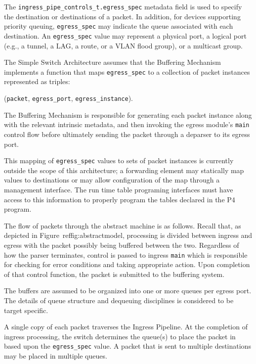 \documentclass[12pt]{article}
\begin{document}

The \texttt{ingress_pipe_controls_t.egress_spec} metadata field is used to
specify the destination  or destinations of a packet. In addition, for devices
supporting priority queuing, \texttt{egress_spec} may indicate the queue
associated with each destination. An \texttt{egress_spec} value may represent a
physical port, a logical port (e.g., a tunnel, a LAG, a route, or a VLAN flood
group), or a multicast group.

The Simple Switch Architecture assumes that the Buffering Mechanism implements a
function that maps \texttt{egress_spec} to a collection of packet instances
represented as triples:

\centerline{(\texttt{packet}, \texttt{egress_port}, \texttt{egress_instance}).}

The Buffering Mechanism is responsible for generating each packet instance along
with the relevant intrinsic metadata, and then invoking the egress module's
\texttt{main} control flow before ultimately sending the packet through a
deparser to its egress port.

This mapping of \texttt{egress_spec} values to sets of packet instances is
currently outside the scope of this architecture; a forwarding element may
statically map values to destinations or may allow configuration of the map
through a management interface. The run time table programing interfaces must
have access to this information to properly program the tables declared in the
P4 program.

The flow of packets through the abstract machine is as follows. Recall that, as
depicted in Figure~ref{fig:abstractmodel}, processing is divided between ingress
and egress with the packet possibly being buffered between the two. Regardless
of how the parser terminates, control is passed to ingress \texttt{main} which
is responsible for checking for error conditions and taking appropriate action.
Upon completion of that control function, the packet is submitted to the
buffering system.

The buffers are assumed to be organized into one or more queues per egress 
port. The details of queue structure and dequeuing disciplines is considered 
to be target specific.

A single copy of each packet traverses the Ingress Pipeline. At the completion
of ingress processing, the switch determines the queue(s) to place the packet in
based upon the \texttt{egress_spec} value. A packet that is sent to multiple
destinations may be placed in multiple queues.
\end{document}
